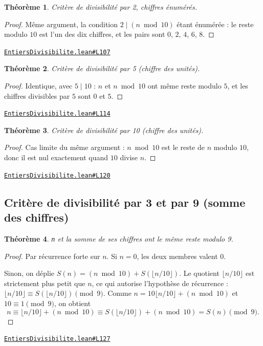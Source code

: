 \documentclass[11pt,a4paper]{article}
\theoremstyle{definition}
\theoremstyle{plain}
\newtheorem{theoreme}{Théorème}
\newcommand{\source}[2]{\par\smallskip\noindent\hfill{\footnotesize\href{#1}{\texttt{#2}}}\par\smallskip}
\begin{document}
\begin{theoreme}
Critère de divisibilité par 2, chiffres énumérés.
\end{theoreme}

\begin{proof}
Même argument, la condition $2 \mid (n \bmod 10)$ étant énumérée : le reste modulo $10$
est l'un des dix chiffres, et les pairs sont $0$, $2$, $4$, $6$, $8$.
\end{proof}
\source{https://github.com/Commutator-IO/learn-lean/blob/main/cours/01-college/01-nombres-et-calculs/EntiersDivisibilite.lean\#L107}{EntiersDivisibilite.lean\#L107}

\begin{theoreme}
Critère de divisibilité par 5 (chiffre des unités).
\end{theoreme}

\begin{proof}
Identique, avec $5 \mid 10$ : $n$ et $n \bmod 10$ ont même reste modulo $5$, et les
chiffres divisibles par $5$ sont $0$ et $5$.
\end{proof}
\source{https://github.com/Commutator-IO/learn-lean/blob/main/cours/01-college/01-nombres-et-calculs/EntiersDivisibilite.lean\#L114}{EntiersDivisibilite.lean\#L114}

\begin{theoreme}
Critère de divisibilité par 10 (chiffre des unités).
\end{theoreme}

\begin{proof}
Cas limite du même argument : $n \bmod 10$ est le reste de $n$ modulo $10$, donc il est
nul exactement quand $10$ divise $n$.
\end{proof}
\source{https://github.com/Commutator-IO/learn-lean/blob/main/cours/01-college/01-nombres-et-calculs/EntiersDivisibilite.lean\#L120}{EntiersDivisibilite.lean\#L120}

\subsection{Critère de divisibilité par 3 et par 9 (somme des chiffres)}

\begin{theoreme}
\texttt{n} et la somme de ses chiffres ont le même reste modulo 9.
\end{theoreme}

\begin{proof}
Par récurrence forte sur $n$. Si $n = 0$, les deux membres valent $0$.

Sinon, on déplie $S(n) = (n \bmod 10) + S(\lfloor n/10 \rfloor)$. Le quotient
$\lfloor n/10 \rfloor$ est strictement plus petit que $n$, ce qui autorise l'hypothèse de
récurrence : $\lfloor n/10 \rfloor \equiv S(\lfloor n/10 \rfloor) \pmod 9$. Comme
$n = 10\lfloor n/10 \rfloor + (n \bmod 10)$ et $10 \equiv 1 \pmod 9$, on obtient
\[
n \equiv \lfloor n/10 \rfloor + (n \bmod 10)
  \equiv S(\lfloor n/10 \rfloor) + (n \bmod 10) = S(n) \pmod 9 .
\]
\end{proof}
\source{https://github.com/Commutator-IO/learn-lean/blob/main/cours/01-college/01-nombres-et-calculs/EntiersDivisibilite.lean\#L127}{EntiersDivisibilite.lean\#L127}
\end{document}
